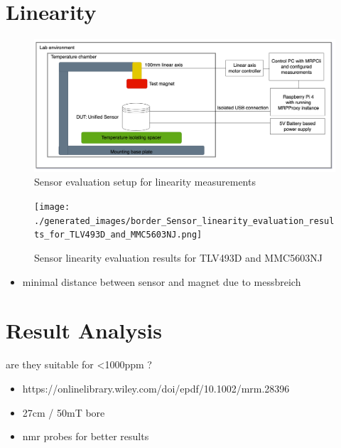 \hypertarget{linearity}{%
\section{Linearity}\label{linearity}}

\begin{figure}
\centering
\includegraphics{./generated_images/border_Sensor_evaluation_setup_for_linearity_measurements.png}
\caption{Sensor evaluation setup for linearity measurements
\label{Sensor_evaluation_setup_for_linearity_measurements.png}}
\end{figure}

\begin{figure}
\centering
\texttt{[image: ./generated\_images/border\_Sensor\_linearity\_evaluation\_results\_for\_TLV493D\_and\_MMC5603NJ.png]}
\caption{Sensor linearity evaluation results for TLV493D and MMC5603NJ
\label{Sensor_linearity_evaluation_results_for_TLV493D_and_MMC5603NJ.png}}
\end{figure}

\begin{itemize}
\tightlist
\item
  minimal distance between sensor and magnet due to messbreich
\end{itemize}

\hypertarget{result-analysis-1}{%
\section{Result Analysis}\label{result-analysis-1}}

are they suitable for \textless1000ppm ?

\begin{itemize}
\tightlist
\item
  https://onlinelibrary.wiley.com/doi/epdf/10.1002/mrm.28396
\item
  27cm / 50mT bore
\item
  nmr probes for better results
\end{itemize}

